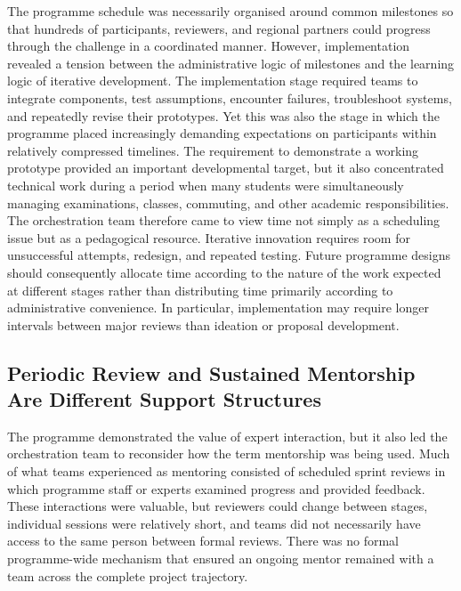 \documentclass[runningheads]{llncs}
\begin{document}
The programme schedule was necessarily organised around common milestones so that hundreds of participants, reviewers, and regional partners could progress through the challenge in a coordinated manner. However, implementation revealed a tension between the administrative logic of milestones and the learning logic of iterative development. The implementation stage required teams to integrate components, test assumptions, encounter failures, troubleshoot systems, and repeatedly revise their prototypes. Yet this was also the stage in which the programme placed increasingly demanding expectations on participants within relatively compressed timelines. The requirement to demonstrate a working prototype provided an important developmental target, but it also concentrated technical work during a period when many students were simultaneously managing examinations, classes, commuting, and other academic responsibilities. The orchestration team therefore came to view time not simply as a scheduling issue but as a pedagogical resource. Iterative innovation requires room for unsuccessful attempts, redesign, and repeated testing. Future programme designs should consequently allocate time according to the nature of the work expected at different stages rather than distributing time primarily according to administrative convenience. In particular, implementation may require longer intervals between major reviews than ideation or proposal development.

\subsection{Periodic Review and Sustained Mentorship Are Different Support Structures}

The programme demonstrated the value of expert interaction, but it also led the orchestration team to reconsider how the term mentorship was being used. Much of what teams experienced as mentoring consisted of scheduled sprint reviews in which programme staff or experts examined progress and provided feedback. These interactions were valuable, but reviewers could change between stages, individual sessions were relatively short, and teams did not necessarily have access to the same person between formal reviews. There was no formal programme-wide mechanism that ensured an ongoing mentor remained with a team across the complete project trajectory.
\end{document}
